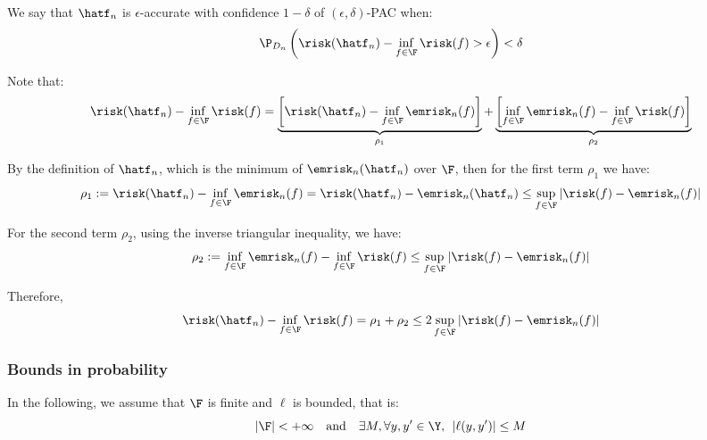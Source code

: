 \documentclass[toc, titlepaged]{../cs-classes/cs-classes}
\begin{document}
\begin{definition}
    We say that $\hatf_n$ is $\epsilon$-accurate with confidence $1-\delta$ of $(\epsilon, \delta)$-PAC when:
    \begin{equation}
        \P_{D_n}\left(\risk(\hatf_n) - \inf_{f\in\F}\risk(f)>\epsilon\right) < \delta
    \end{equation}
\end{definition}

Note that:
\begin{equation*}
    \risk(\hatf_n)-\inf_{f\in\F}\risk(f) = \underbrace{\left[\risk(\hatf_n)-\inf_{f\in\F}\emrisk_n(f)\right]}_{\rho_1} + \underbrace{\left[\inf_{f\in\F}\emrisk_n(f)-\inf_{f\in\F}\risk(f)\right]}_{\rho_2}
\end{equation*}

By the definition of $\hatf_n$, which is the minimum of $\emrisk_n(\hatf_n)$ over $\F$, then for the first term $\rho_1$ we have:
\begin{equation*}
    \rho_1 := \risk(\hatf_n)-\inf_{f\in\F}\emrisk_n(f) = \risk(\hatf_n)-\emrisk_n(\hatf_n) \leq \sup_{f\in\F} |\risk(f)-\emrisk_n(f)|
\end{equation*}

For the second term $\rho_2$, using the inverse triangular inequality, we have:
\begin{equation*}
    \rho_2:=\inf_{f\in\F}\emrisk_n(f)-\inf_{f\in\F}\risk(f) \leq \sup_{f\in\F}|\risk(f)-\emrisk_n(f)|
\end{equation*}

Therefore, 
\begin{equation*}
    \risk(\hatf_n)-\inf_{f\in\F}\risk(f) = \rho_1+\rho_2 \leq 2\sup_{f\in\F}|\risk(f)-\emrisk_n(f)|
\end{equation*}

\subsubsection{Bounds in probability}
In the following, we assume that $\F$ is finite and $\ell$ is bounded, that is:
\begin{equation*}
    |\F|<+\infty \quad \textnormal{and} \quad \exists M, \forall y, y'\in\Y, \:\: |\ell(y, y')|\leq M
\end{equation*}
\end{document}
